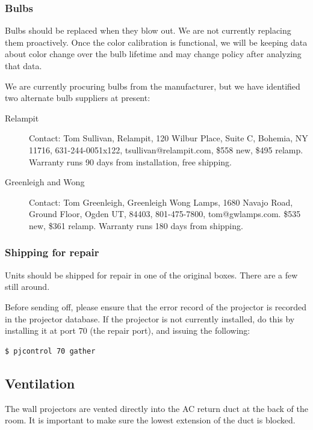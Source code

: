 \documentclass[11pt]{article}
\begin{document}
\subsubsection{Bulbs}

Bulbs should be replaced when they blow out.  We are not currently
replacing them proactively.  Once the color calibration is functional,
we will be keeping data about color change over the bulb lifetime and
may change policy after analyzing that data.

We are currently procuring bulbs from the manufacturer, but we have
identified two alternate bulb suppliers at present:

\begin{description}

\item[Relampit] Contact: Tom Sullivan, Relampit, 120 Wilbur Place, Suite C,
Bohemia, NY 11716, 631-244-0051x122, tsullivan@relampit.com, \$558
new, \$495 relamp.  Warranty runs 90 days from installation, free
shipping.

\item[Greenleigh and Wong] Contact: Tom Greenleigh, Greenleigh Wong Lamps, 1680
Navajo Road, Ground Floor, Ogden UT, 84403, 801-475-7800,
tom@gwlamps.com. \$535 new, \$361 relamp.  Warranty runs 180 days from
shipping.

\end{description}


\subsubsection{Shipping for repair}

Units should be shipped for repair in one of the original boxes. There
are a few still around.

Before sending off, please ensure that the error record of the
projector is recorded in the projector database. If the projector is
not currently installed, do this by installing it at port 70 (the
repair port), and issuing the following:

\begin{verbatim}
$ pjcontrol 70 gather
\end{verbatim}




\subsection{Ventilation}

The wall projectors are vented directly into the AC return duct at the
back of the room.  It is important to make sure the lowest extension
of the duct is blocked.
\end{document}
